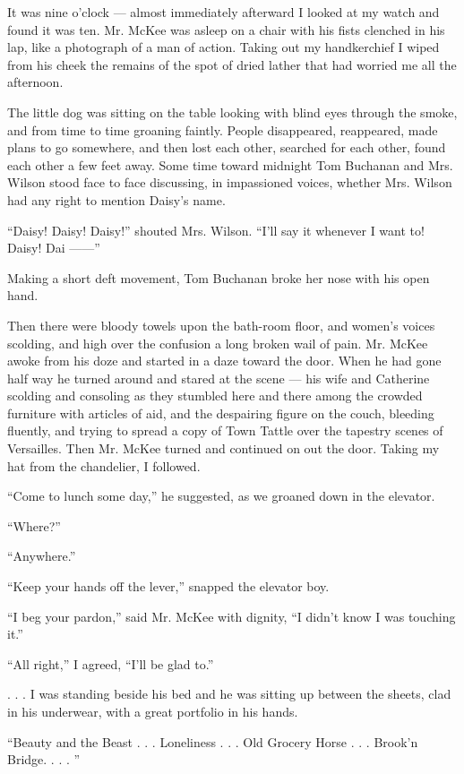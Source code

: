 \documentclass{znotebook}
\begin{document}
It was nine o’clock — almost immediately afterward I looked at my watch and found it was ten. Mr. McKee was asleep on a chair with his fists clenched in his lap, like a photograph of a man of action. Taking out my handkerchief I wiped from his cheek the remains of the spot of dried lather that had worried me all the afternoon.

The little dog was sitting on the table looking with blind eyes through the smoke, and from time to time groaning faintly. People disappeared, reappeared, made plans to go somewhere, and then lost each other, searched for each other, found each other a few feet away. Some time toward midnight Tom Buchanan and Mrs. Wilson stood face to face discussing, in impassioned voices, whether Mrs. Wilson had any right to mention Daisy’s name.

``Daisy! Daisy! Daisy!'' shouted Mrs. Wilson. ``I’ll say it whenever I want to! Daisy! Dai ——''

Making a short deft movement, Tom Buchanan broke her nose with his open hand.

Then there were bloody towels upon the bath-room floor, and women’s voices scolding, and high over the confusion a long broken wail of pain. Mr. McKee awoke from his doze and started in a daze toward the door. When he had gone half way he turned around and stared at the scene — his wife and Catherine scolding and consoling as they stumbled here and there among the crowded furniture with articles of aid, and the despairing figure on the couch, bleeding fluently, and trying to spread a copy of Town Tattle over the tapestry scenes of Versailles. Then Mr. McKee turned and continued on out the door. Taking my hat from the chandelier, I followed.

``Come to lunch some day,'' he suggested, as we groaned down in the elevator.

``Where?''

``Anywhere.''

``Keep your hands off the lever,'' snapped the elevator boy.

``I beg your pardon,'' said Mr. McKee with dignity, ``I didn’t know I was touching it.''

``All right,'' I agreed, ``I’ll be glad to.''

. . . I was standing beside his bed and he was sitting up between the sheets, clad in his underwear, with a great portfolio in his hands.

``Beauty and the Beast . . . Loneliness . . . Old Grocery Horse . . . Brook’n Bridge. . . . ''
\end{document}

